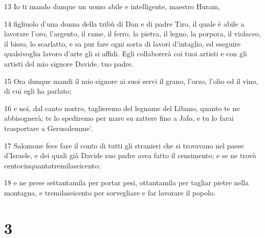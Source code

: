 \par 13 Io ti mando dunque un uomo abile e intelligente, maestro Huram,
\par 14 figliuolo d'una donna della tribù di Dan e di padre Tiro, il quale è abile a lavorare l'oro, l'argento, il rame, il ferro, la pietra, il legno, la porpora, il violaceo, il bisso, lo scarlatto, e sa pur fare ogni sorta di lavori d'intaglio, ed eseguire qualsivoglia lavoro d'arte gli si affidi. Egli collaborerà coi tuoi artisti e con gli artisti del mio signore Davide, tuo padre.
\par 15 Ora dunque mandi il mio signore ai suoi servi il grano, l'orzo, l'olio ed il vino, di cui egli ha parlato;
\par 16 e noi, dal canto nostro, taglieremo del legname del Libano, quanto te ne abbisognerà; te lo spediremo per mare su zattere fino a Jafo, e tu lo farai trasportare a Gerusalemme'.
\par 17 Salomone fece fare il conto di tutti gli stranieri che si trovavano nel paese d'Israele, e dei quali già Davide suo padre avea fatto il censimento; e se ne trovò centocinquantatremilaseicento;
\par 18 e ne prese settantamila per portar pesi, ottantamila per tagliar pietre nella montagna, e tremilaseicento per sorvegliare e far lavorare il popolo.

\chapter{3}

